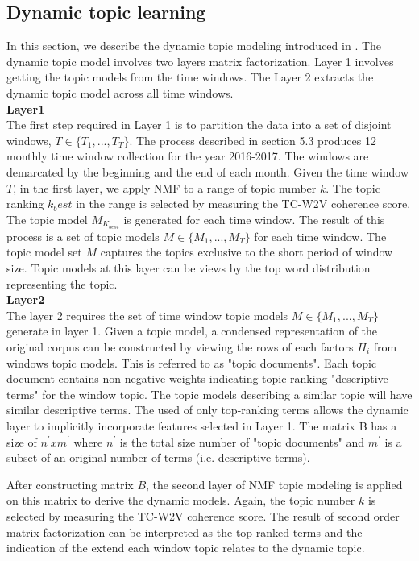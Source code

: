 \subsection{Dynamic topic learning}
In this section, we describe the dynamic topic modeling introduced in \cite{Greene2016}. The dynamic topic model involves two layers matrix factorization. Layer 1 involves getting the topic models from the time windows. The Layer 2 extracts the dynamic topic model across all time windows. \\
\textbf{Layer1}\\
The first step required in Layer 1 is to partition the data into a set of disjoint windows, $T \in \{T_1,  ...,  T_T\}$. The process described in section 5.3 produces 12 monthly time window collection for the year 2016-2017. The windows are demarcated by the beginning and the end of each month. Given the time window $T$, in the first layer, we apply NMF to a range of topic number $k$. The topic ranking $k_best$ in the range is selected by measuring the TC-W2V coherence score. The topic model $M_{K_{best}}$ is generated for each time window. The result of this process is a set of topic models $M \in \{M_1, ...,  M_T\}$ for each time window. The topic model set $M$ captures the topics exclusive to the short period of window size. Topic models at this layer can be views by the top word distribution representing the topic. \\
\textbf{Layer2} \\
The layer 2 requires the set of time window topic models $M \in \{M_1, ...,  M_T\}$ generate in layer 1. Given a topic model, a condensed representation of the original corpus can be constructed by viewing the rows of each factors $H_i$ from windows topic models. This is referred to as "topic documents". Each topic document contains non-negative weights indicating topic ranking "descriptive terms" for the window topic. The topic models describing a similar topic will have similar descriptive terms. The used of only top-ranking terms allows the dynamic layer to implicitly incorporate features selected in Layer 1.  The matrix B has a size of $n^{'} x m^{'}$ where $n^{'}$ is the total size number of "topic documents" and $m^{'}$ is a subset of an original number of terms (i.e. descriptive terms). 

After constructing matrix $B$, the second layer of NMF topic modeling is applied on this matrix to derive the dynamic models. Again, the topic number $k$ is selected by measuring the TC-W2V coherence score.  The result of second order matrix factorization can be interpreted as the top-ranked terms and the indication of the extend each window topic relates to the dynamic topic. 

